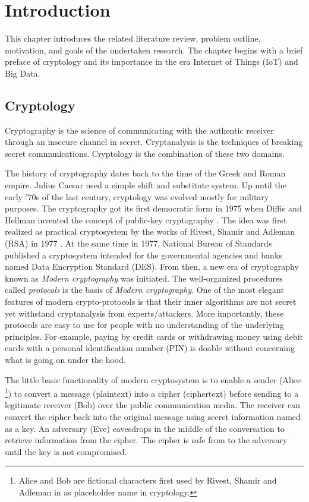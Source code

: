 \chapter{Introduction}
\label{chap:Introduction}
This chapter introduces the related literature review, problem outline, motivation, and goals of the undertaken research.
The chapter begins with a brief preface of cryptology and its importance in the era Internet of Things (IoT) and Big Data.

\section{Cryptology }
\label{chap:sec:crypto}
Cryptography is the science of communicating with the authentic receiver through an insecure channel in secret. 
Cryptanalysis is the techniques of breaking secret communications.
Cryptology is the combination of these two domains.

The history of cryptography dates back to the time of the Greek and Roman empire.
Julius Caesar used a simple shift and substitute system.
Up until the early '70s of the last century, cryptology was evolved mostly for military purposes. 
The cryptography got its first democratic form in 1975 when Diffie and Hellman invented the concept of public-key cryptography \cite{diffie1976new}. 
The idea was first realized as practical cryptosystem by the works of Rivest, Shamir and Adleman (RSA) in 1977 \cite{rivest1978method}. 
At the same time in 1977, National Bureau of Standards published a cryptosystem intended for the governmental agencies and banks named Data Encryption Standard (DES).
From then, a new era of cryptography known as \textit{Modern cryptography} was initiated.
The well-organized procedures called \textit{protocols} is the basis of \textit{Modern cryptography}.
One of the most elegant features of modern crypto-protocols is that their inner algorithms are not secret yet withstand cryptanalysis from experts/attackers.
More importantly, these protocols are easy to use for people with no understanding of the underlying principles.
For example, paying by credit cards or withdrawing money using debit cards with a personal identification number (PIN) is doable without concerning what is going on under the hood. 

The little basic functionality of modern cryptosystem is to enable a sender (Alice \footnote{Alice and Bob are fictional characters first used by Rivest, Shamir and Adleman in \cite{rivest1978method} as placeholder name in cryptology.}) to convert a message (plaintext) into a cipher (ciphertext) before sending to a legitimate receiver (Bob) over the public communication media. 
The receiver can convert the cipher back into the original message using secret information named as a key.
An adversary (Eve) eavesdrops in the middle of the conversation to retrieve information from the cipher.
The cipher is safe from to the adversary until the key is not compromised. 

